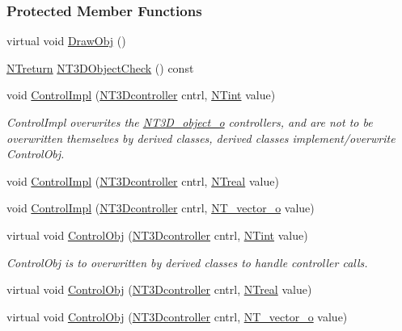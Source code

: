 \subsubsection*{Protected Member Functions}
\begin{DoxyCompactItemize}
\item 
virtual void \hyperlink{class_n_t3_d__hierarchic__object__o_a2e909a5c752d5560133bd1bdb32147ec}{DrawObj} ()
\item 
\hyperlink{nt__types_8h_ab9564ee8f091e809d21b8451c6683c53}{NTreturn} \hyperlink{class_n_t3_d__hierarchic__object__o_aa72fc7f69da123e3cf433a0b847816f8}{NT3DObjectCheck} () const 
\item 
void \hyperlink{class_n_t3_d__hierarchic__object__o_ad29aae36b4d227c00e0e5c3de2c82a6c}{ControlImpl} (\hyperlink{nt3d__object__obj_8h_ae59ecf13a3631bc4a9ea41f90de08351}{NT3Dcontroller} cntrl, \hyperlink{nt__types_8h_aee8aa0a9869e8b5c97c6c02217ff09cd}{NTint} value)
\begin{DoxyCompactList}\small\item\em ControlImpl overwrites the \hyperlink{class_n_t3_d__object__o}{NT3D\_\-object\_\-o} controllers, and are not to be overwritten themselves by derived classes, derived classes implement/overwrite ControlObj. \item\end{DoxyCompactList}\item 
void \hyperlink{class_n_t3_d__hierarchic__object__o_a8334ae0cd34cb8696223ab8aad3d6455}{ControlImpl} (\hyperlink{nt3d__object__obj_8h_ae59ecf13a3631bc4a9ea41f90de08351}{NT3Dcontroller} cntrl, \hyperlink{nt__types_8h_a814a97893e9deb1eedcc7604529ba80d}{NTreal} value)
\item 
void \hyperlink{class_n_t3_d__hierarchic__object__o_a7e4f5dd57aefbf5da38d11a4d7e24bed}{ControlImpl} (\hyperlink{nt3d__object__obj_8h_ae59ecf13a3631bc4a9ea41f90de08351}{NT3Dcontroller} cntrl, \hyperlink{class_n_t__vector__o}{NT\_\-vector\_\-o} value)
\item 
virtual void \hyperlink{class_n_t3_d__hierarchic__object__o_a44e300863e04239cbfd92efe76862eb1}{ControlObj} (\hyperlink{nt3d__object__obj_8h_ae59ecf13a3631bc4a9ea41f90de08351}{NT3Dcontroller} cntrl, \hyperlink{nt__types_8h_aee8aa0a9869e8b5c97c6c02217ff09cd}{NTint} value)
\begin{DoxyCompactList}\small\item\em ControlObj is to overwritten by derived classes to handle controller calls. \item\end{DoxyCompactList}\item 
virtual void \hyperlink{class_n_t3_d__hierarchic__object__o_a7ba64aea4674da8cd6abff48e51596fe}{ControlObj} (\hyperlink{nt3d__object__obj_8h_ae59ecf13a3631bc4a9ea41f90de08351}{NT3Dcontroller} cntrl, \hyperlink{nt__types_8h_a814a97893e9deb1eedcc7604529ba80d}{NTreal} value)
\item 
virtual void \hyperlink{class_n_t3_d__hierarchic__object__o_af5ef3139f819bb89d919f65218035cde}{ControlObj} (\hyperlink{nt3d__object__obj_8h_ae59ecf13a3631bc4a9ea41f90de08351}{NT3Dcontroller} cntrl, \hyperlink{class_n_t__vector__o}{NT\_\-vector\_\-o} value)
\end{DoxyCompactItemize}


